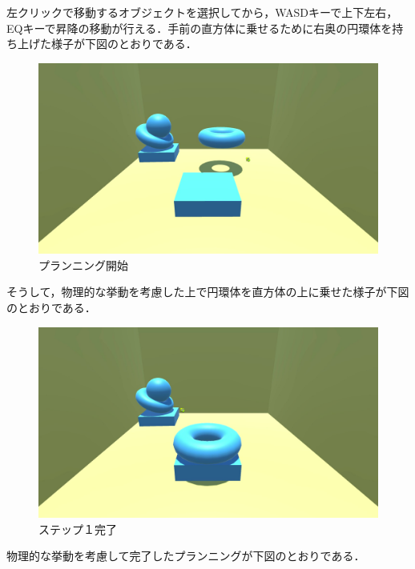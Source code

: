 \documentclass[uplatex,12pt]{jsarticle}
\begin{document}
左クリックで移動するオブジェクトを選択してから，WASDキーで上下左右，EQキーで昇降の移動が行える．手前の直方体に乗せるために右奥の円環体を持ち上げた様子が下図のとおりである．

\begin{figure}[!hbt]
  	\begin{center}
  		\includegraphics[scale=0.2]{images/bwp5.jpg}
	\end{center}
  	\caption{プランニング開始}
\end{figure}
\clearpage

そうして，物理的な挙動を考慮した上で円環体を直方体の上に乗せた様子が下図のとおりである．

\begin{figure}[!hbt]
  	\begin{center}
  		\includegraphics[scale=0.2]{images/bwp6.jpg}
	\end{center}
  	\caption{ステップ１完了}
\end{figure}
\clearpage

物理的な挙動を考慮して完了したプランニングが下図のとおりである．
\end{document}
